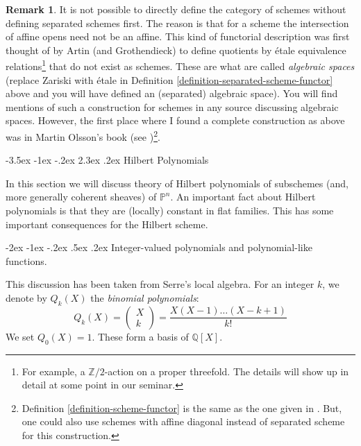 \documentclass[11pt]{amsart}
\makeatletter
\renewcommand\section{\@startsection {section}{1}{\z@}%
	{-3.5ex \@plus -1ex \@minus -.2ex}%
	{2.3ex \@plus.2ex}%
	{\normalfont\scshape\center}}
\renewcommand\subsection{\@startsection {subsection}{1}{\z@}%
	{-2ex \@plus -1ex \@minus -.2ex}%
	{.5ex \@plus.2ex}%
	{\normalfont\bfseries}}
\renewcommand{\P}{{\mathbb P}}
\newcommand{\Q}{{\mathbb Q}}
\newcommand{\Z}{{\mathbb Z}}
\theoremstyle{definition}
\newtheorem{remark}[theorem]{Remark}
\makeatother
\begin{document}
\begin{remark}
	\label{remark-algebraic-spaces}
	It is not possible to directly define the category of schemes without defining separated schemes first. The reason is that for a scheme the intersection of affine opens need not be an affine. This kind of functorial description was first thought of by Artin (and Grothendieck) to define quotients by \'{e}tale equivalence relations\footnote{For example, a $\Z/2$-action on a proper threefold. The details will show up in detail at some point in our seminar.} that do not exist as schemes. These are what are called \textit{algebraic spaces} (replace Zariski with \'{e}tale in Definition \ref{definition-separated-scheme-functor} above and you will have defined an (separated) algebraic space). You will find mentions of such a construction for schemes in any source discussing algebraic spaces. However, the first place where I found a complete construction as above was in Martin Olsson's book (see \cite{olsson16})\footnote{Definition \ref{definition-scheme-functor} is the same as the one given in \cite{olsson16}. But, one could also use schemes with affine diagonal instead of separated scheme for this construction.}.
\end{remark}



\section{Hilbert Polynomials}

In this section we will discuss theory of Hilbert polynomials of subschemes (and, more generally coherent sheaves) of $\P^n$. An important fact about Hilbert polynomials is that they are (locally) constant in flat families. This has some important consequences for the Hilbert scheme.

\subsection{Integer-valued polynomials and polynomial-like functions.}

This discussion has been taken from Serre's local algebra. For an integer $k$, we denote by $Q_k(X)$ the \textit{binomial polynomials}:
\[Q_k(X) = \begin{pmatrix}
X \\
k
\end{pmatrix} = \frac{X(X-1)\ldots(X-k+1)}{k!}\]
We set $Q_0(X)=1$. These form a basis of $\Q[X]$.
\end{document}
